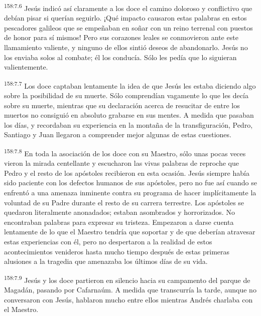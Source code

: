 \par 
\textsuperscript{158:7.6} Jesús indicó así claramente a los doce el camino doloroso y conflictivo que debían pisar si querían seguirlo. ¡Qué impacto causaron estas palabras en estos pescadores galileos que se empeñaban en soñar con un reino terrenal con puestos de honor para sí mismos! Pero sus corazones leales se conmovieron ante este llamamiento valiente, y ninguno de ellos sintió deseos de abandonarlo. Jesús no los enviaba solos al combate; él los conducía. Sólo les pedía que lo siguieran valientemente.

\par 
\textsuperscript{158:7.7} Los doce captaban lentamente la idea de que Jesús les estaba diciendo algo sobre la posibilidad de su muerte. Sólo comprendían vagamente lo que les decía sobre su muerte, mientras que su declaración acerca de resucitar de entre los muertos no consiguió en absoluto grabarse en sus mentes. A medida que pasaban los días, y recordaban su experiencia en la montaña de la transfiguración, Pedro, Santiago y Juan llegaron a comprender mejor algunas de estas cuestiones.

\par 
\textsuperscript{158:7.8} En toda la asociación de los doce con su Maestro, sólo unas pocas veces vieron la mirada centellante y escucharon las vivas palabras de reproche que Pedro y el resto de los apóstoles recibieron en esta ocasión. Jesús siempre había sido paciente con los defectos humanos de sus apóstoles, pero no fue así cuando se enfrentó a una amenaza inminente contra su programa de hacer implícitamente la voluntad de su Padre durante el resto de su carrera terrestre. Los apóstoles se quedaron literalmente anonadados; estaban asombrados y horrorizados. No encontraban palabras para expresar su tristeza. Empezaron a darse cuenta lentamente de lo que el Maestro tendría que soportar y de que deberían atravesar estas experiencias con él, pero no despertaron a la realidad de estos acontecimientos venideros hasta mucho tiempo después de estas primeras alusiones a la tragedia que amenazaba los últimos días de su vida.

\par 
\textsuperscript{158:7.9} Jesús y los doce partieron en silencio hacia su campamento del parque de Magadán, pasando por Cafarnaúm. A medida que transcurría la tarde, aunque no conversaron con Jesús, hablaron mucho entre ellos mientras Andrés charlaba con el Maestro.

